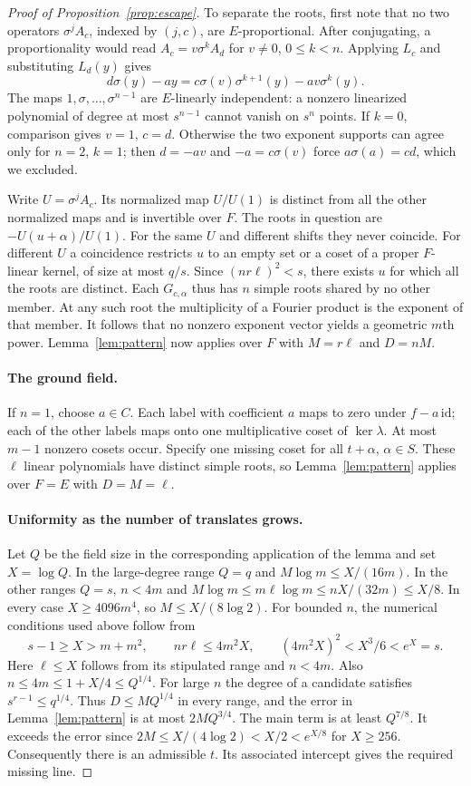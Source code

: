 \documentclass[preprint,12pt,numbers]{elsarticle}
\begin{document}
\begin{proof}[Proof of Proposition~\ref{prop:escape}]
To separate the roots, first note that no two operators
$\sigma^j A_c$, indexed by $(j,c)$, are $E$-proportional. After
conjugating, a proportionality would read $A_c=v\sigma^k A_d$ for
$v\ne0$, $0\le k<n$. Applying $L_c$ and substituting $L_d(y)$ gives
\[
 d\sigma(y)-ay
   =c\sigma(v)\sigma^{k+1}(y)-av\sigma^k(y).
\]
The maps $1,\sigma,\ldots,\sigma^{n-1}$ are $E$-linearly independent:
a nonzero linearized polynomial of degree at most $s^{n-1}$ cannot
vanish on $s^n$ points. If $k=0$, comparison gives $v=1$, $c=d$.
Otherwise the two exponent supports can agree only for $n=2$, $k=1$;
then $d=-av$ and $-a=c\sigma(v)$ force $a\sigma(a)=cd$, which we
excluded.

Write $U=\sigma^j A_c$. Its normalized map $U/U(1)$ is distinct from
all the other normalized maps and is invertible over $F$. The roots
in question are $-U(u+\alpha)/U(1)$. For the same $U$ and different
shifts they never coincide. For different $U$ a coincidence restricts
$u$ to an empty set or a coset of a proper $F$-linear kernel, of size
at most $q/s$. Since $(nr\ell)^2<s$, there exists $u$ for which all the
roots are distinct. Each $G_{c,\alpha}$ thus has $n$ simple roots
shared by no other member. At any such root the multiplicity of a
Fourier product is the exponent of that member. It follows that no
nonzero exponent vector yields a geometric $m$th power.
Lemma~\ref{lem:pattern} now applies over $F$ with $M=r\ell$ and
$D=nM$.

\paragraph{The ground field.}
If $n=1$, choose $a\in C$. Each label with coefficient $a$ maps to zero
under $f-a\,\mathrm{id}$; each of the other labels maps onto one
multiplicative coset of $\ker\lambda$. At most $m-1$ nonzero cosets
occur. Specify one missing coset for all $t+\alpha$, $\alpha\in S$.
These $\ell$ linear polynomials have distinct simple roots, so
Lemma~\ref{lem:pattern} applies over $F=E$ with $D=M=\ell$.

\paragraph{Uniformity as the number of translates grows.}
Let $Q$ be the field size in the corresponding application of the lemma
and set $X=\log Q$. In the large-degree range $Q=q$ and
$M\log m\le X/(16m)$. In the other ranges $Q=s$, $n<4m$ and
$M\log m\le m\ell\log m\le nX/(32m)\le X/8$.
In every case $X\ge4096m^4$, so $M\le X/(8\log2)$.
For bounded $n$, the numerical conditions used above follow from
\[
 s-1\ge X>m+m^2,\qquad
 nr\ell\le 4m^2 X,\qquad
 (4m^2 X)^2<X^3/6<e^X=s.
\]
Here $\ell\le X$ follows from its stipulated range and $n<4m$.
Also $n\le4m\le 1+X/4\le Q^{1/4}$. For large $n$ the degree of a
candidate satisfies $s^{r-1}\le q^{1/4}$. Thus $D\le M Q^{1/4}$
in every range, and the error in Lemma~\ref{lem:pattern} is at most
$2M Q^{3/4}$. The main term is at least $Q^{7/8}$. It exceeds the
error since $2M\le X/(4\log2)<X/2<e^{X/8}$ for $X\ge256$.
Consequently there is an admissible $t$. Its associated intercept gives
the required missing line.
\end{proof}
\end{document}
